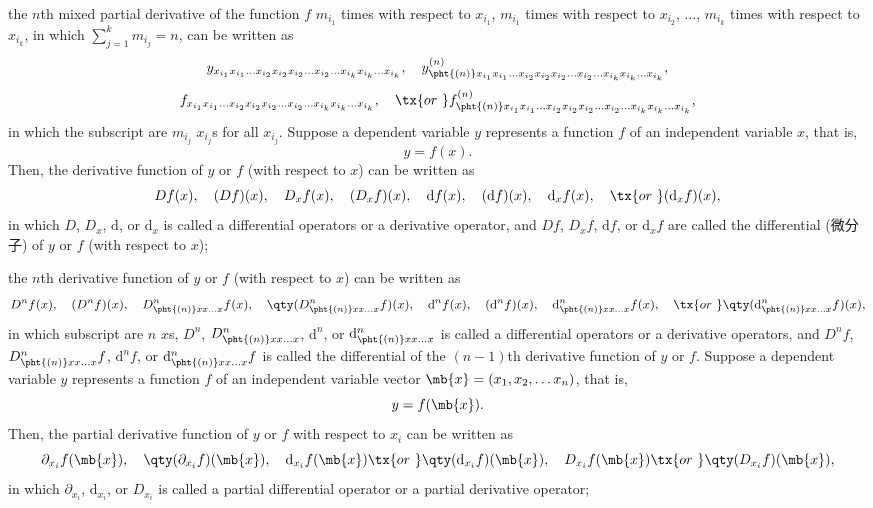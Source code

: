 \documentclass[a4paper,12pt]{report}
\begin{document}
\begin{itemize}
\begin{itemize}
the $n$th mixed partial derivative of the function $f$ $m_{i_1}$ times with respect to $x_{i_1}$, $m_{i_1}$ times with respect to $x_{i_2}$, $\dots $, $m_{i_k}$ times with respect to $x_{i_k}$, in which $\sum_{j=1}^km_{i_j}=n$, can be written as
\[y_{x_{i_1}x_{i_1}\dots  x_{i_2}x_{i_2}x_{i_2}\dots  x_{i_2}\dots  x_{i_k}x_{i_k}\dots  x_{i_k}},\quad y^{(n)}_{\pht{(n)}x_{i_1}x_{i_1}\dots  x_{i_2}x_{i_2}x_{i_2}\dots  x_{i_2}\dots  x_{i_k}x_{i_k}\dots  x_{i_k}},\]
\[f_{x_{i_1}x_{i_1}\dots  x_{i_2}x_{i_2}x_{i_2}\dots  x_{i_2}\dots  x_{i_k}x_{i_k}\dots  x_{i_k}},\quad \tx{or\ }f^{(n)}_{\pht{(n)}x_{i_1}x_{i_1}\dots  x_{i_2}x_{i_2}x_{i_2}\dots  x_{i_2}\dots  x_{i_k}x_{i_k}\dots  x_{i_k}},\]
in which the subscript are $m_{i_j}$ $x_{i_j}$s for all $x_{i_j}$.
Suppose a dependent variable $y$ represents a function $f$ of an independent variable $x$, that is,
\[y=f(x).\]
Then, the derivative function of $y$ or $f$ (with respect to $x$) can be written as
\[Df(x),\quad(Df)(x),\quad D_xf(x),\quad (D_xf)(x),\quad \mathrm{d}f(x),\quad(\mathrm{d}f)(x),\quad \mathrm{d}_xf(x),\quad \tx{or\ }(\mathrm{d}_xf)(x),\]
in which $D$, $D_x$, $\mathrm{d}$, or $\mathrm{d}_x$ is called a differential operators or a derivative operator, and  $Df$, $D_xf$, $\mathrm{d}f$, or $\mathrm{d}_xf$ are called the differential (微分子) of $y$ or $f$ (with respect to $x$);

the $n$th derivative function of $y$ or $f$ (with respect to $x$) can be written as
\[D^nf(x),\quad(D^nf)(x),\quad D^n_{\pht{(n)}xx\dots x}f(x),\quad\qty(D^n_{\pht{(n)}xx\dots x}f)(x),\quad \mathrm{d}^nf(x),\quad(\mathrm{d}^nf)(x),\quad \mathrm{d}^n_{\pht{(n)}xx\dots x}f(x),\quad \tx{or\ }\qty(\mathrm{d}^n_{\pht{(n)}xx\dots x}f)(x),\]
in which subscript are $n$ $x$s, $D^n$, $D^n_{\pht{(n)}xx\dots x}$, $\mathrm{d}^n$, or $\mathrm{d}^n_{\pht{(n)}xx\dots x}$ is called a differential operators or a derivative operators, and $D^nf$, $D^n_{\pht{(n)}xx\dots x}f$, $\mathrm{d}^nf$, or $\mathrm{d}^n_{\pht{(n)}xx\dots x}f$ is called the differential of the $(n-1)$th derivative function of $y$ or $f$.
Suppose a dependent variable $y$ represents a function $f$ of an independent variable vector $\mb{x}=(x_1,x_2,\dots x_n)$, that is,
\[y=f(\mb{x}).\]
Then, the partial derivative function of $y$ or $f$ with respect to $x_i$ can be written as
\[\partial_{x_i}f(\mb{x}),\quad \qty(\partial_{x_i}f)(\mb{x}),\quad \mathrm{d}_{x_i}f(\mb{x})\tx{or\ }\qty(\mathrm{d}_{x_i}f)(\mb{x}),\quad D_{x_i}f(\mb{x})\tx{or\ }\qty(D_{x_i}f)(\mb{x}),\]
in which $\partial_{x_i}$, $\mathrm{d}_{x_i}$, or $D_{x_i}$ is called a partial differential operator or a partial derivative operator;


\end{itemize}
\end{itemize}
\end{document}
